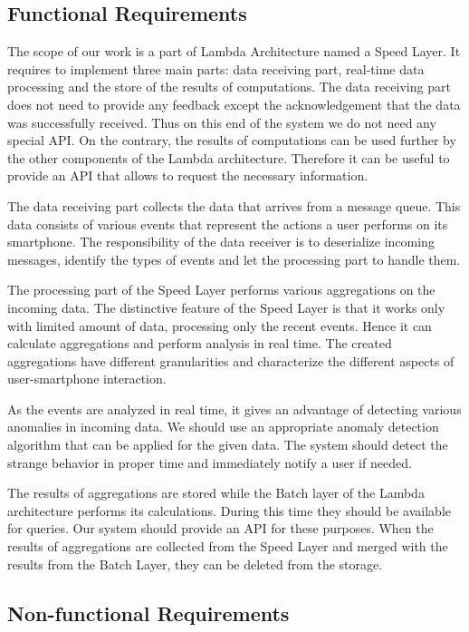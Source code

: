 \subsection{Functional Requirements}

The scope of our work is a part of Lambda Architecture named a Speed Layer.
It requires to implement three main parts: data receiving part, real-time data processing and the store of the results of computations.
The data receiving part does not need to provide any feedback except the acknowledgement that the data was successfully received.
Thus on this end of the system we do not need any special API.
On the contrary, the results of computations can be used further by the other components of the Lambda architecture.
Therefore it can be useful to provide an API that allows to request the necessary information.


The data receiving part collects the data that arrives from a message queue.
This data consists of various events that represent the actions a user performs on its smartphone. 
The responsibility of the data receiver is to deserialize incoming messages, identify the types of events and let the processing part to handle them.

The processing part of the Speed Layer performs various aggregations on the incoming data.
The distinctive feature of the Speed Layer is that it works only with limited amount of data, processing only the recent events.
Hence it can calculate aggregations and perform analysis in real time.
The created aggregations have different granularities and characterize the different aspects of user-smartphone interaction.

As the events are analyzed in real time, it gives an advantage of detecting various anomalies in incoming data.
We should use an appropriate anomaly detection algorithm that can be applied for the given data.
The system should detect the strange behavior in proper time and immediately notify a user if needed.

The results of aggregations are stored while the Batch layer of the Lambda architecture performs its calculations.
During this time they should be available for queries.
Our system should provide an API for these purposes.
When the results of aggregations are collected from the Speed Layer and merged with the results from the Batch Layer, they can be deleted from the storage.
 
\subsection{Non-functional Requirements}

